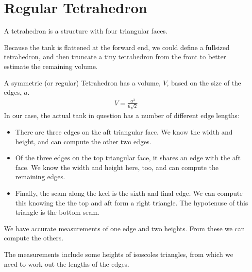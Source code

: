 \documentclass[letterpaper,10pt,english]{sphinxmanual}
\begin{document}
\section{Regular Tetrahedron}
\label{\detokenize{tetrahedron:regular-tetrahedron}}\label{\detokenize{tetrahedron::doc}}
\sphinxAtStartPar
A tetrahedron is a structure with four triangular faces.

\sphinxAtStartPar
Because the tank is flattened at the forward end, we could define a full\sphinxhyphen{}sized tetrahedron, and
then truncate a tiny tetrahedron from the front to better estimate the remaining volume.

\sphinxAtStartPar
A symmetric (or regular) Tetrahedron has a volume, \(V\), based on the size of the edges, \(a\).
\begin{equation*}
\begin{split}
V = \frac{a^3}{6\sqrt{2}}
\end{split}
\end{equation*}
\sphinxAtStartPar
In our case, the actual tank in question has a number of different edge lengths:
\begin{itemize}
\item {} 
\sphinxAtStartPar
There are three edges on the aft triangular face. We know the width and height, and can compute the other two edges.

\item {} 
\sphinxAtStartPar
Of the three edges on the top triangular face, it shares an edge with the aft face. We know the width and height here, too, and can compute the remaining edges.

\item {} 
\sphinxAtStartPar
Finally, the seam along the keel is the sixth and final edge. We can compute this knowing the the top and aft form a right triangle. The hypotenuse of this triangle is the bottom seam.

\end{itemize}

\sphinxAtStartPar
We have accurate measurements of one edge and two heights. From these we can compute the others.

\begin{sphinxVerbatim}[commandchars=\\\{\}]
   
\end{sphinxVerbatim}

\sphinxAtStartPar
The measurements include some heights of isoscoles triangles, from which we need to work out the lengths of the edges.
\end{document}
